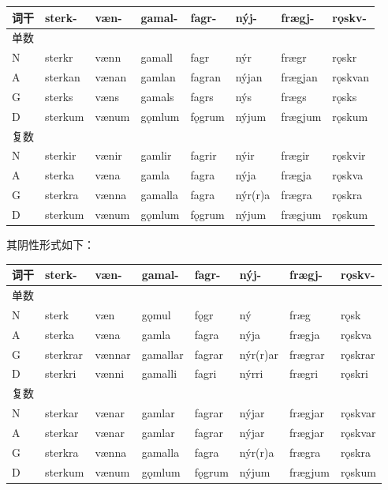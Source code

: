 \begin{longtable}{llllllll}
\toprule
词干 & sterk- & væn- & gamal- & fagr- & nýj- & frægj- & rǫskv- \\
\midrule
\endhead
\bottomrule
\endfoot
单数 & & & & & & & \\
N & sterkr & vænn & gamall & fagr & nýr & frægr & rǫskr \\
A & sterkan & vænan & gamlan & fagran & nýjan & frægjan & rǫskvan \\
G & sterks & væns & gamals & fagrs & nýs & frægs & rǫsks \\
D & sterkum & vænum & gǫmlum & fǫgrum & nýjum & frægjum & rǫskum \\
复数 & & & & & & & \\
N & sterkir & vænir & gamlir & fagrir & nýir & frægir & rǫskvir \\
A & sterka & væna & gamla & fagra & nýja & frægja & rǫskva \\
G & sterkra & vænna & gamalla & fagra & nýr(r)a & frægra & rǫskra \\
D & sterkum & vænum & gǫmlum & fǫgrum & nýjum & frægjum & rǫskum \\
\end{longtable}

其阴性形式如下：

\begin{longtable}{llllllll}
\toprule
词干 & sterk- & væn- & gamal- & fagr- & nýj- & frægj- & rǫskv- \\
\midrule
\endhead
\bottomrule
\endfoot
单数 & & & & & & & \\
N & sterk & væn & gǫmul & fǫgr & ný & fræg & rǫsk \\
A & sterka & væna & gamla & fagra & nýja & frægja & rǫskva \\
G & sterkrar & vænnar & gamallar & fagrar & nýr(r)ar & frægrar &
rǫskrar \\
D & sterkri & vænni & gamalli & fagri & nýrri & frægri & rǫskri \\
复数 & & & & & & & \\
N & sterkar & vænar & gamlar & fagrar & nýjar & frægjar & rǫskvar \\
A & sterkar & vænar & gamlar & fagrar & nýjar & frægjar & rǫskvar \\
G & sterkra & vænna & gamalla & fagra & nýr(r)a & frægra & rǫskra \\
D & sterkum & vænum & gǫmlum & fǫgrum & nýjum & frægjum & rǫskum \\
\end{longtable}


